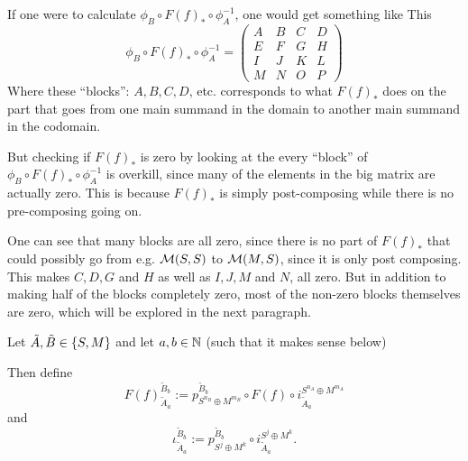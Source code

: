 \begin{remark}
\begin{center}
    \end{center}
    If one were to calculate \( \phi_B \circ F(f)_* \circ \phi_A^{-1} \), one would get something like This
    \[
        \phi_B \circ F(f)_* \circ \phi_A^{-1} =
        \begin{pmatrix}
            A & B & C & D \\
            E & F & G & H \\
            I & J & K & L \\
            M & N & O & P
        \end{pmatrix}
    \]
    Where these ``blocks'': \( A, B, C, D \), etc. corresponds to what \( F(f)_* \) does on the part that goes from one main summand in the domain to another main summand in the codomain.
    
    But checking if \( F(f)_* \) is zero by looking at the every ``block'' of \( \phi_B \circ F(f)_* \circ \phi_A^{-1} \) is overkill, since many of the elements in the big matrix are actually zero. This is because \( F(f)_* \) is simply post-composing while there is no pre-composing going on.
    
    One can see that many blocks are all zero, since there is no part of \( F(f)_* \) that could possibly go from e.g. \( {\mathcal{M}}(S, S) \) to \( {\mathcal{M}}(M, S) \), since it is only post composing. This makes \( C, D, G \) and \( H \) as well as \( I, J, M \) and \( N \), all zero. But in addition to making half of the blocks completely zero, most of the non-zero blocks themselves are zero, which will be explored in the next paragraph.
    
    Let \( \tilde{A}, \tilde{B} \in \{ S, M \} \) and let \( a, b \in {\mathbb{N}} \) (such that it makes sense below)

    Then define
    \[
        F(f)_{\tilde{A}_a}^{\tilde{B}_b} := p_{S^{n_B} \oplus M^{m_B}}^{\tilde{B}_b} \circ F(f) \circ i_{\tilde{A}_a}^{S^{n_A} \oplus M^{m_A}}
    \]
    and
    \[
        \iota_{\tilde{A}_a}^{\tilde{B}_b} := p_{S^j \oplus M^k}^{\tilde{B}_b} \circ i_{\tilde{A}_a}^{S^j \oplus M^k}.
    \]


\end{remark}
